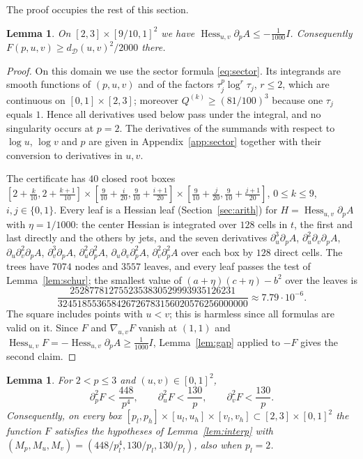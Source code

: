\documentclass[11pt]{amsart}
\newtheorem{lemma}[theorem]{Lemma}
\theoremstyle{definition}
\theoremstyle{remark}
\numberwithin{equation}{section}
\newcommand{\Hess}{\operatorname{Hess}}
\newcommand{\cD}{\mathcal{D}}
\begin{document}
The proof occupies the rest of this section.

\begin{lemma}\label{lem:n2local}
On $[2,3]\times[9/10,1]^2$ we have $\Hess_{u,v}\partial_pA\le-\frac1{1000}I$. Consequently $F(p,u,v)\ge d_\cD(u,v)^2/2000$ there.
\end{lemma}

\begin{proof}
On this domain we use the sector formula \eqref{eq:sector}. Its integrands are smooth functions of $(p,u,v)$ and of the factors $\tau_j^p\log^r\tau_j$, $r\le 2$, which are continuous on $[0,1]\times[2,3]$; moreover $Q^{(k)}\ge(81/100)^3$ because one $\tau_j$ equals $1$. Hence all derivatives used below pass under the integral, and no singularity occurs at $p=2$. The derivatives of the summands with respect to $\log u$, $\log v$ and $p$ are given in Appendix~\ref{app:sector} together with their conversion to derivatives in $u,v$.

The certificate has $40$ closed root boxes $[2+\frac k{10},2+\frac{k+1}{10}]\times[\frac9{10}+\frac i{20},\frac9{10}+\frac{i+1}{20}]\times[\frac9{10}+\frac j{20},\frac9{10}+\frac{j+1}{20}]$, $0\le k\le9$, $i,j\in\{0,1\}$. Every leaf is a Hessian leaf (Section~\ref{sec:arith}) for $H=\Hess_{u,v}\partial_pA$ with $\eta=1/1000$: the center Hessian is integrated over $128$ cells in $t$, the first and last directly and the others by jets, and the seven derivatives $\partial_u^3\partial_pA$, $\partial_u^2\partial_v\partial_pA$, $\partial_u\partial_v^2\partial_pA$, $\partial_v^3\partial_pA$, $\partial_u^2\partial_p^2A$, $\partial_u\partial_v\partial_p^2A$, $\partial_v^2\partial_p^2A$ over each box by $128$ direct cells. The trees have $7074$ nodes and $3557$ leaves, and every leaf passes the test of Lemma~\ref{lem:schur}; the smallest value of $(a+\eta)(c+\eta)-b^2$ over the leaves is
\[
\frac{2528778127552353830529993935126231}{324518553658426726783156020576256000000}\approx7.79\cdot10^{-6}.
\] The square includes points with $u<v$; this is harmless since all formulas are valid on it. Since $F$ and $\nabla_{u,v}F$ vanish at $(1,1)$ and $\Hess_{u,v}F=-\Hess_{u,v}\partial_pA\ge\frac1{1000}I$, Lemma~\ref{lem:gap} applied to $-F$ gives the second claim.
\end{proof}

\begin{lemma}\label{lem:n2constants}
For $2<p\le3$ and $(u,v)\in[0,1]^2$,
\[
\partial_p^2F<\frac{448}{p^4},\qquad \partial_u^2F<\frac{130}p,\qquad \partial_v^2F<\frac{130}p .
\]
Consequently, on every box $[p_l,p_h]\times[u_l,u_h]\times[v_l,v_h]\subset[2,3]\times[0,1]^2$ the function $F$ satisfies the hypotheses of Lemma~\ref{lem:interp} with $(M_p,M_u,M_v)=(448/p_l^4,130/p_l,130/p_l)$, also when $p_l=2$.
\end{lemma}
\end{document}
